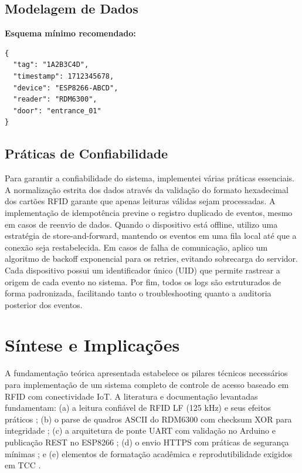 \subsection{Modelagem de Dados}

\textbf{Esquema mínimo recomendado:}
\begin{verbatim}
{
  "tag": "1A2B3C4D",
  "timestamp": 1712345678,
  "device": "ESP8266-ABCD",
  "reader": "RDM6300",
  "door": "entrance_01"
}
\end{verbatim}

\subsection{Práticas de Confiabilidade}

Para garantir a confiabilidade do sistema, implementei várias práticas essenciais. A normalização estrita dos dados através da validação do formato hexadecimal dos cartões RFID garante que apenas leituras válidas sejam processadas. A implementação de idempotência previne o registro duplicado de eventos, mesmo em casos de reenvio de dados. Quando o dispositivo está offline, utilizo uma estratégia de store-and-forward, mantendo os eventos em uma fila local até que a conexão seja restabelecida. Em casos de falha de comunicação, aplico um algoritmo de backoff exponencial para os retries, evitando sobrecarga do servidor. Cada dispositivo possui um identificador único (UID) que permite rastrear a origem de cada evento no sistema. Por fim, todos os logs são estruturados de forma padronizada, facilitando tanto o troubleshooting quanto a auditoria posterior dos eventos.

\section{Síntese e Implicações}
\label{sec:sintese}

A fundamentação teórica apresentada estabelece os pilares técnicos necessários para implementação de um sistema completo de controle de acesso baseado em RFID com conectividade IoT. A literatura e documentação levantadas fundamentam: (a) a leitura confiável de RFID LF (125 kHz) e seus efeitos práticos \cite{vieira-rfid-2007,avery-dennison-rfid}; (b) o parse de quadros ASCII do RDM6300 com checksum XOR para integridade \cite{seeed-rfid-125khz}; (c) a arquitetura de ponte UART com validação no Arduino e publicação REST no ESP8266 \cite{embarcados-serial,makerhero-esp8266}; (d) o envio HTTPS com práticas de segurança mínimas \cite{mdn-https,firebase-rtdb}; e (e) elementos de formatação acadêmica e reprodutibilidade exigidos em TCC \cite{abnt-2018,abnt-2023,abnt-2024}.

